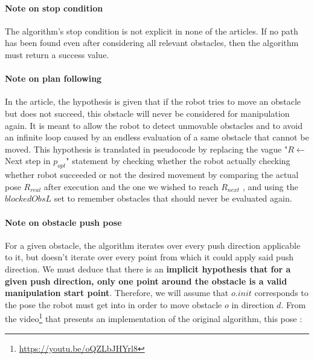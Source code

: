 \paragraph{Note on stop condition}\label{stop_condition_note} The algorithm's stop condition is not explicit in none of the articles. If no path has been found even after considering all relevant obstacles, then the algorithm must return a success value.

\paragraph{Note on plan following}\label{plan_following_note} In the article, the hypothesis is given that if the robot tries to move an obstacle but does not succeed, this obstacle will never be considered for manipulation again. It is meant to allow the robot to detect unmovable obstacles and to avoid an infinite loop caused by an endless evaluation of a same obstacle that cannot be moved. This hypothesis is translated in pseudocode by replacing the vague "$R \gets$ Next step in $p_{opt}$" statement by checking whether the robot actually checking whether robot succeeded or not the desired movement by comparing the actual pose $R_{real}$ after execution and the one we wished to reach $R_{next}$ , and using the $blockedObsL$ set to remember obstacles that should never be evaluated again.

\paragraph{Note on obstacle push pose}\label{obstacle_pushpose_note} For a given obstacle, the algorithm iterates over every push direction applicable to it, but doesn't iterate over every point from which it could apply said push direction. We must deduce that there is an \textbf{implicit hypothesis that for a given push direction, only one point around the obstacle is a valid manipulation start point}. Therefore, we will assume that $o.init$ corresponds to the pose the robot must get into in order to move obstacle $o$ in direction $d$. From the video\footnote{\url{https://youtu.be/oQZLbJHYrl8}} that presents an implementation of the original algorithm, this pose :

